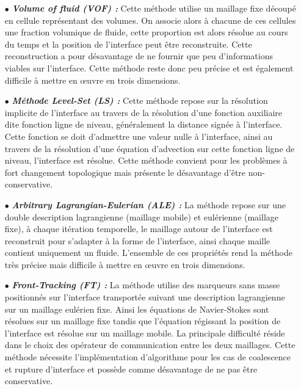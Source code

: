 \begin{itemize}
	\item[$\bullet$] \textit{\textbf{Volume of fluid (VOF) : }} Cette méthode utilise un maillage fixe découpé en cellule représentant des volumes. On associe alors à chacune de ces cellules une fraction volumique de fluide, cette proportion est alors résolue au cours du temps et la position de l'interface peut être reconstruite. Cette reconstruction a pour désavantage de ne fournir que peu d'informations viables sur l'interface. Cette méthode reste donc peu précise et est également difficile à mettre en \oe uvre en trois dimensions.
	\item[$\bullet$] \textit{\textbf{Méthode Level-Set (LS) : }}	Cette méthode repose sur la résolution implicite de l'interface au travers de la résolution d'une fonction auxiliaire dite fonction ligne de niveau, généralement la distance signée à l'interface. Cette fonction se doit d'admettre une valeur nulle à l'interface, ainsi au travers de la résolution d'une équation d'advection sur cette fonction ligne de niveau, l'interface est résolue. Cette méthode convient pour les problèmes à fort changement topologique mais présente le désavantage d'être non-conservative.
	\item[$\bullet$]\textit{\textbf{Arbitrary Lagrangian-Eulerian (ALE) : }} La méthode repose sur une double description lagrangienne (maillage mobile) et eulérienne (maillage fixe), à chaque itération temporelle, le maillage autour de l'interface est reconstruit pour s'adapter à la forme de l'interface, ainsi chaque maille contient uniquement un fluide. L'ensemble de ces propriétés rend la méthode très précise mais difficile à mettre en \oe uvre en trois dimensions.
	\item[$\bullet$]\textit{\textbf{Front-Tracking (FT) : }} La méthode utilise des marqueurs sans masse positionnés sur l'interface transportée suivant une description lagrangienne sur un maillage eulérien fixe. Ainsi les équations de Navier-Stokes sont résolues sur un maillage fixe tandis que l'équation régissant la position de l'interface est résolue sur un maillage mobile. La principale difficulté réside dans le choix des opérateur de communication entre les deux maillages. Cette méthode nécessite l'implémentation d'algorithme pour les cas de coalescence et rupture d'interface et possède comme désavantage de ne pas être conservative.
\end{itemize}








